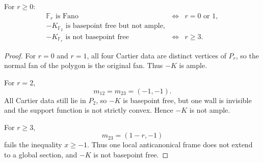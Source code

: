 \begin{proposition}
\label{prop:hirzebruch-anticanonical-positivity}
For \(r\geq0\):
\[
\begin{array}{rcl}
\mathbb F_r\text{ is Fano}
&\Longleftrightarrow&
r=0\text{ or }1,\\[1mm]
-K_{\mathbb F_2}\text{ is basepoint free but not ample},&&\\[-1mm]
-K_{\mathbb F_r}\text{ is not basepoint free}
&\Longleftrightarrow&
r\geq3.
\end{array}
\]
\end{proposition}

\begin{proof}
For \(r=0\) and \(r=1\), all four Cartier data are distinct vertices
of \(P_r\), so the normal fan of the polygon is the original fan.
Thus \(-K\) is ample.

For \(r=2\),
\[
m_{12}=m_{23}=(-1,-1).
\]
All Cartier data still lie in \(P_2\), so \(-K\) is basepoint free,
but one wall is invisible and the support function is not strictly
convex. Hence \(-K\) is not ample.

For \(r\geq3\),
\[
m_{23}=(1-r,-1)
\]
fails the inequality \(x\geq-1\). Thus one local anticanonical frame
does not extend to a global section, and \(-K\) is not basepoint
free.
\end{proof}


